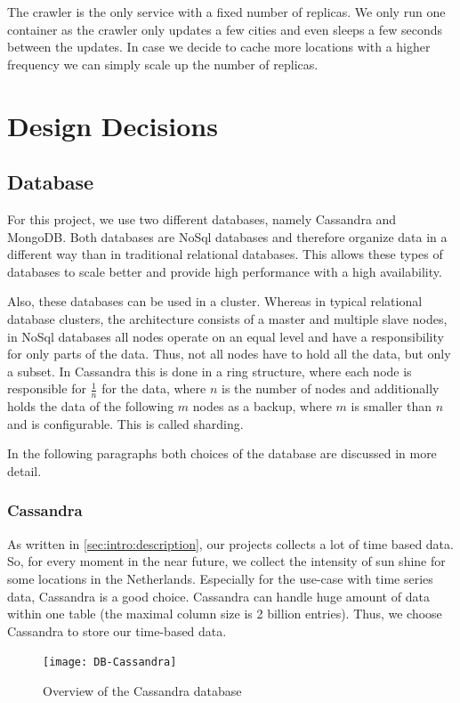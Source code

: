 \documentclass[a4paper]{article}
\begin{document}
The crawler is the only service with a fixed number of replicas. We only run one container as the crawler only updates a few cities and even sleeps a few seconds between the updates. In case we decide to cache more locations with a higher frequency we can simply scale up the number of replicas.

\section{Design Decisions}\label{sec:dd}
\subsection{Database}
For this project, we use two different databases, namely Cassandra and MongoDB. Both databases are NoSql databases and therefore organize data in a different way than in traditional relational databases. This allows these types of databases to scale better and provide high performance with a high availability.

Also, these databases can be used in a cluster. Whereas in typical relational database clusters, the architecture consists of a master and multiple slave nodes, in NoSql databases all nodes operate on an equal level and have a responsibility for only parts of the data. Thus, not all nodes have to hold all the data, but only a subset. In Cassandra this is done in a ring structure, where each node is responsible for $\frac{1}{n}$ for the data, where $n$ is the number of nodes and additionally holds the data of the following $m$ nodes as a backup, where $m$ is smaller than $n$ and is configurable. This is called sharding.

In the following paragraphs both choices of the database are discussed in more detail.

\subsubsection{Cassandra}
As written in \ref{sec:intro:description}, our projects collects a lot of time based data. So, for every moment in the near future, we collect the intensity of sun shine for some locations in the Netherlands. Especially for the use-case with time series data, Cassandra is a good choice. Cassandra can handle huge amount of data within one table (the maximal column size is 2 billion entries). Thus, we choose Cassandra to store our time-based data.

\begin{figure}[ht]
	\centering
	\texttt{[image: DB-Cassandra]}
	\caption{Overview of the Cassandra database}
	\label{fig:db:cassandra}
\end{figure}
\end{document}

